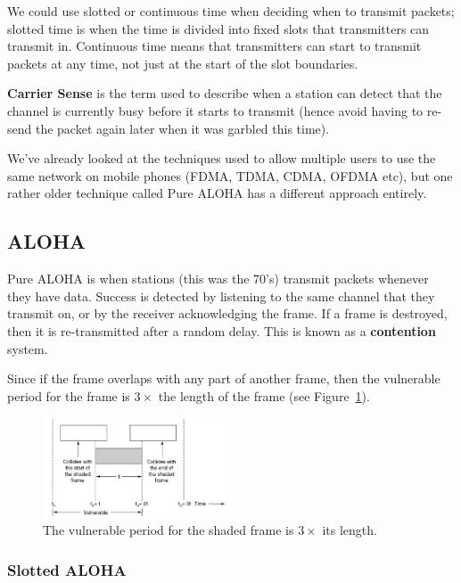We could use slotted or continuous time when deciding when to transmit packets;
slotted time is when the time is divided into fixed slots that transmitters can
transmit in. Continuous time means that transmitters can start to transmit
packets at any time, not just at the start of the slot boundaries.

\textbf{Carrier Sense} is the term used to describe when a station can detect
that the channel is currently busy before it starts to transmit (hence avoid
having to re-send the packet again later when it was garbled this time).

We've already looked at the techniques used to allow multiple users to use the
same network on mobile phones (FDMA, TDMA, CDMA, OFDMA etc), but one rather
older technique called Pure ALOHA has a different approach entirely.

\subsection{ALOHA}

Pure ALOHA is when stations (this was the 70's) transmit packets whenever they
have data. Success is detected by listening to the same channel that they
transmit on, or by the receiver acknowledging the frame. If a frame is
destroyed, then it is re-transmitted after a random delay. 
This is known as a \textbf{contention} system.

Since if the frame overlaps with any part of another frame, then the vulnerable
period for the frame is $3\times$ the length of the frame (see
Figure~\ref{aloha-vun}).

\begin{figure}
  \centering
  \includegraphics[width=0.5\textwidth]{images/aloha-vun}
  \caption{The vulnerable period for the shaded frame is $3\times$ its length.}
  \label{aloha-vun}
\end{figure}

\subsubsection{Slotted ALOHA}

